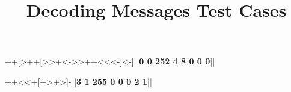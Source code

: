 \documentclass{../../codeproblem}
\begin{document}
\title{Decoding Messages Test Cases}

\begin{example}
++[>++[>>+<->>++<<<-]<-]
|\textbf{0 0 252 4 8 0 0 0}||\end{example}

\begin{example}
++<<+[+>+>]-
|\textbf{3 1 255 0 0 0 2 1}||\end{example}
\end{document}
